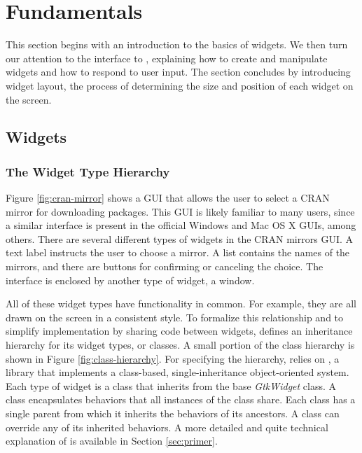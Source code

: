 \documentclass[article]{jss}
\begin{document}
\section{Fundamentals}

This section begins with an introduction to the basics of  widgets.
We then turn our attention to the  interface to 
, explaining how to create and manipulate widgets and how to respond to
user input. The section concludes by introducing widget layout, the process
of determining the size and position of each widget on the screen.


\subsection[GTK+ Widgets]{ Widgets}

\subsubsection{The Widget Type Hierarchy}

Figure \ref{fig:cran-mirror} shows a  GUI that allows the user to
select a CRAN mirror for downloading  packages.
This GUI is likely familiar to many  users, since a similar interface
is present in the official Windows and Mac OS X  GUIs, among others.
There are several different types of widgets in the CRAN mirrors GUI. A
text label instructs the user to choose a mirror.  A list contains the 
names of the mirrors, and there are buttons for confirming or canceling the choice. 
The interface is enclosed by another type of widget, a window. 

All of these widget types have functionality in common. For example, they are
all drawn on the screen in a consistent style. To formalize this relationship 
and to simplify implementation by sharing code
between widgets,  defines an inheritance hierarchy for its widget
types, or classes. A small portion of the  class hierarchy is shown
in Figure \ref{fig:class-hierarchy}. For specifying the hierarchy,  
relies on , a  library that implements a class-based, single-inheritance 
object-oriented system.  Each type of  widget is a  
class that inherits from the base \emph{GtkWidget} class. A  
class encapsulates behaviors that all instances of the class share. 
Each class has a single parent from which it inherits 
the behaviors of its ancestors. A class can override any of its inherited behaviors.
A more detailed and quite technical explanation of  is available in 
Section \ref{sec:primer}. 
\end{document}
